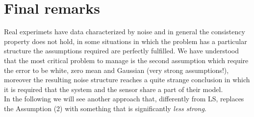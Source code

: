 \section{Final remarks}
Real experimets have data characterized by noise and in general the consistency property does not hold, in some situations in which the problem has a particular structure the assumptions required are perfectly fulfilled. We have understood that the most critical problem to manage is the second assumption which require the error to be white, zero mean and Gaussian (very strong assumptions!), moreover the resulting noise structure reaches a quite strange conclusion in which it is required that the system and the sensor share a part of their model. \\
In the following we will see another approach that, differently from LS, replaces the Assumption (2) with something that is significantly \textit{less strong}.

